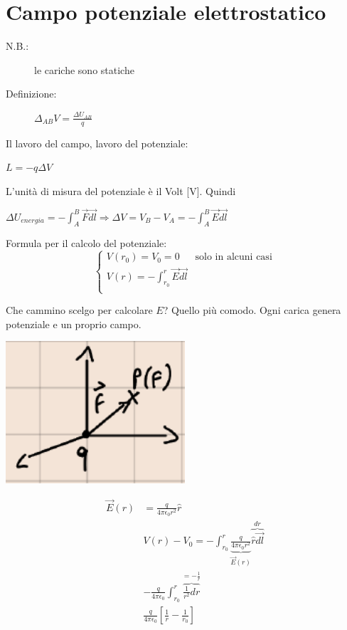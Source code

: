 \documentclass[a4paper, 12pt]{book}
\theoremstyle{plain}
\begin{document}
\section{Campo potenziale elettrostatico}

\begin{description}
    \item[N.B.:] le cariche sono statiche
    \item[Definizione:] $\Delta_{AB}V=\frac{\Delta U_{AB}}{q}$ 
\end{description}

Il lavoro del campo, lavoro del potenziale:
\begin{center}
    \item $L=-q\Delta V$
\end{center}

L'unità di misura del potenziale è il Volt [V].
Quindi

\begin{center}

    $\Delta U_{energia} = -\int_A^B \vec{F}\vec{dl} \Rightarrow 
\Delta V=V_B-V_A=-\int_A^B\vec{E}\vec{dl}$

\end{center}
Formula per il calcolo del potenziale:
\[
\begin{cases}
V(r_0) = V_0 = 0 & \mbox{solo in alcuni casi} \\
V(r) = -\int_{r_0}^{r} \vec{E} \vec{dl} \\
\end{cases}
\]

Che cammino scelgo per calcolare $E$? Quello più comodo. Ogni carica genera potenziale e un proprio campo.

\begin{center}
	\includegraphics[width=0.5\textwidth]{gr_part.png}
\end{center}      

\[
\begin{split}
	\vec{E} (r) &= \frac{q}{4\pi \epsilon_0 r^2} \hat{r} \\
	&V(r) - V_0 = -\int_{r_0}^{r} \underbrace{\frac{q}{4\pi \epsilon_0 r^2} }_{\vec{E}(r)} \overbrace{\hat{r} \vec{dl}}^{dr} \\
	&-\frac{q}{4\pi \epsilon_0} \int_{r_0}^{r} \overbrace{\frac{1}{r^2}dr}^{=-\frac{1}{r}} \\
	&\frac{q}{4\pi \epsilon_0}[\frac{1}{r} - \frac{1}{r_0}] \\
\end{split}  
\]      
\end{document}

